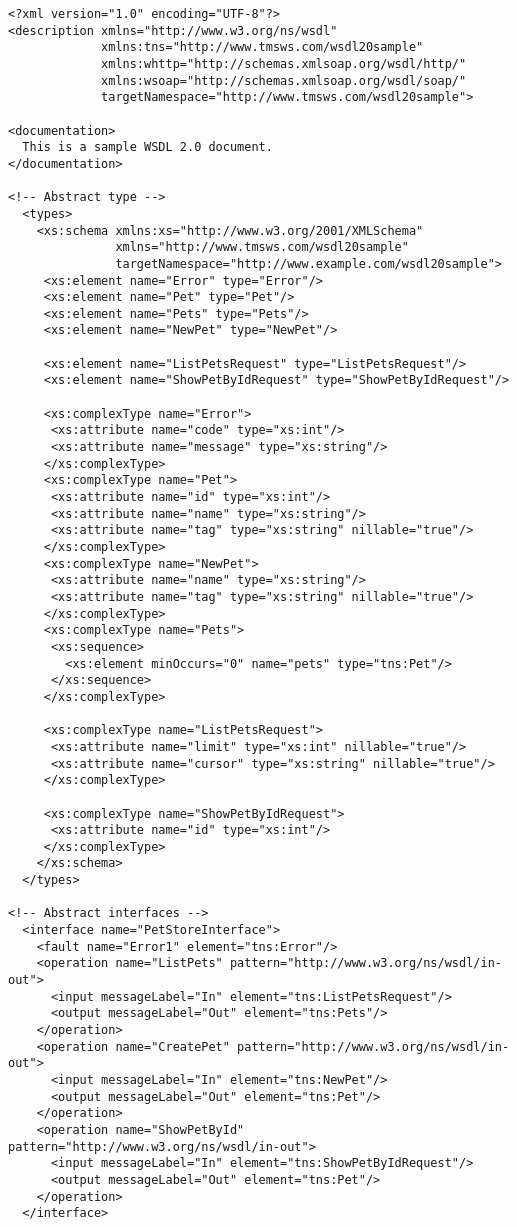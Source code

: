 \begin{verbatim}
<?xml version="1.0" encoding="UTF-8"?>
<description xmlns="http://www.w3.org/ns/wsdl"
             xmlns:tns="http://www.tmsws.com/wsdl20sample"
             xmlns:whttp="http://schemas.xmlsoap.org/wsdl/http/"
             xmlns:wsoap="http://schemas.xmlsoap.org/wsdl/soap/"
             targetNamespace="http://www.tmsws.com/wsdl20sample">

<documentation>
  This is a sample WSDL 2.0 document.
</documentation>

<!-- Abstract type -->
  <types>
    <xs:schema xmlns:xs="http://www.w3.org/2001/XMLSchema"
               xmlns="http://www.tmsws.com/wsdl20sample"
               targetNamespace="http://www.example.com/wsdl20sample">
     <xs:element name="Error" type="Error"/>
     <xs:element name="Pet" type="Pet"/>
     <xs:element name="Pets" type="Pets"/>
     <xs:element name="NewPet" type="NewPet"/>

     <xs:element name="ListPetsRequest" type="ListPetsRequest"/>
     <xs:element name="ShowPetByIdRequest" type="ShowPetByIdRequest"/>

     <xs:complexType name="Error">
      <xs:attribute name="code" type="xs:int"/>
      <xs:attribute name="message" type="xs:string"/>
     </xs:complexType>
     <xs:complexType name="Pet">
      <xs:attribute name="id" type="xs:int"/>
      <xs:attribute name="name" type="xs:string"/>
      <xs:attribute name="tag" type="xs:string" nillable="true"/>
     </xs:complexType>
     <xs:complexType name="NewPet">
      <xs:attribute name="name" type="xs:string"/>
      <xs:attribute name="tag" type="xs:string" nillable="true"/>
     </xs:complexType>
     <xs:complexType name="Pets">
      <xs:sequence>
        <xs:element minOccurs="0" name="pets" type="tns:Pet"/>
      </xs:sequence>
     </xs:complexType>

     <xs:complexType name="ListPetsRequest">
      <xs:attribute name="limit" type="xs:int" nillable="true"/>
      <xs:attribute name="cursor" type="xs:string" nillable="true"/>
     </xs:complexType>

     <xs:complexType name="ShowPetByIdRequest">
      <xs:attribute name="id" type="xs:int"/>
     </xs:complexType>
    </xs:schema>
  </types>

<!-- Abstract interfaces -->
  <interface name="PetStoreInterface">
    <fault name="Error1" element="tns:Error"/>
    <operation name="ListPets" pattern="http://www.w3.org/ns/wsdl/in-out">
      <input messageLabel="In" element="tns:ListPetsRequest"/>
      <output messageLabel="Out" element="tns:Pets"/>
    </operation>
    <operation name="CreatePet" pattern="http://www.w3.org/ns/wsdl/in-out">
      <input messageLabel="In" element="tns:NewPet"/>
      <output messageLabel="Out" element="tns:Pet"/>
    </operation>
    <operation name="ShowPetById" pattern="http://www.w3.org/ns/wsdl/in-out">
      <input messageLabel="In" element="tns:ShowPetByIdRequest"/>
      <output messageLabel="Out" element="tns:Pet"/>
    </operation>
  </interface>


\end{verbatim}
